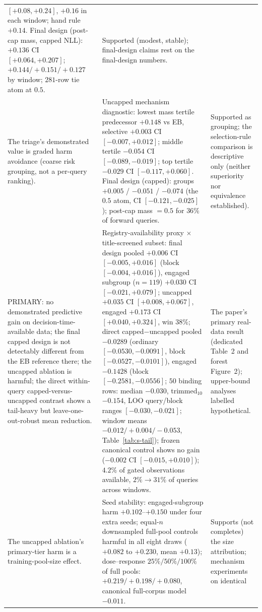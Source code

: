 \documentclass[11pt]{article}
\begin{document}
\begin{longtable}{p{} p{} p{}}
$[+0.08,+0.24]$, $+0.16$ in each window; hand rule $+0.14$. Final
design (post-cap mass, capped NLL): $+0.136$ CI $[+0.064,+0.207]$;
$+0.144/+0.151/+0.127$ by window; $281$-row tie atom at $0.5$. &
Supported
(modest, stable); final-design claims rest on the final-design
numbers. \\
The triage's demonstrated value is graded harm avoidance (coarse risk
grouping, not a per-query ranking). & Uncapped mechanism diagnostic:
lowest mass
tertile predecessor $+0.148$ vs EB, selective $+0.003$ CI $[-0.007,+0.012]$;
middle tertile $-0.054$ CI $[-0.089,-0.019]$; top tertile $-0.029$ CI
$[-0.117,+0.060]$. Final design (capped): groups $+0.005$ / $-0.051$ /
$-0.074$ (the $0.5$ atom, CI $[-0.121,-0.025]$); post-cap mass $= 0.5$
for $36\%$ of forward queries. & Supported as grouping; the
selection-rule comparison is descriptive only (neither superiority nor
equivalence established). \\
PRIMARY: no demonstrated predictive gain on decision-time-available
data; the final
capped design is not detectably different from the EB reference there;
the uncapped ablation is harmful; the direct within-query
capped-versus-uncapped contrast shows a tail-heavy but
leave-one-out-robust mean reduction. &
Registry-availability proxy $\times$ title-screened subset: final design
pooled $+0.006$ CI $[-0.005,+0.016]$ (block $[-0.004,+0.016]$), engaged
subgroup ($n=119$) $+0.030$ CI $[-0.021,+0.079]$; uncapped $+0.035$ CI
$[+0.008,+0.067]$, engaged $+0.173$ CI $[+0.040,+0.324]$, win $38\%$;
direct capped$-$uncapped pooled $-0.0289$ (ordinary
$[-0.0530,-0.0091]$, block $[-0.0527,-0.0101]$), engaged $-0.1428$
(block $[-0.2581,-0.0556]$; $50$ binding rows: median $-0.030$,
trimmed$_{10}$ $-0.154$, LOO query/block ranges $[-0.030,-0.021]$;
window means $-0.012/+0.004/-0.053$, Table~\ref{tab:s-tail});
frozen canonical control shows no gain ($-0.002$ CI $[-0.015,+0.010]$);
$4.2\%$
of gated observations available, $2\%\to31\%$ of queries across windows. &
The paper's primary real-data result (dedicated Table~2 and forest
Figure~2); upper-bound analyses labelled hypothetical. \\
The uncapped ablation's primary-tier harm is a training-pool-size effect. &
Seed stability: engaged-subgroup harm $+0.102$--$+0.150$ under four extra
seeds; equal-$n$ downsampled full-pool controls harmful in all eight draws
($+0.082$ to $+0.230$, mean $+0.13$); dose--response $25\%/50\%/100\%$ of
full pools:
$+0.219/+0.198/+0.080$, canonical full-corpus model $-0.011$. & Supports
(not completes) the size attribution; mechanism experiments on identical

\end{longtable}
\end{document}
